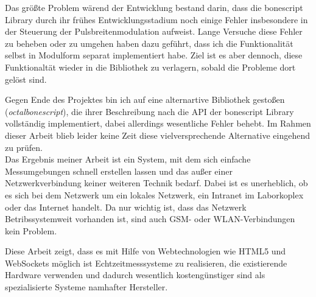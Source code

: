 Das größte Problem wärend der Entwicklung bestand darin, dass die bonescript Library durch ihr frühes Entwicklungsstadium noch einige Fehler insbesondere in der Steuerung der Pulsbreitenmodulation aufweist. Lange Versuche diese Fehler zu beheben oder zu umgehen haben dazu geführt, dass ich die Funktionalität selbst in Modulform separat implementiert habe. Ziel ist es aber dennoch, diese Funktionaltät wieder in die Bibliothek zu verlagern, sobald die Probleme dort gelöst sind. 

Gegen Ende des Projektes bin ich auf eine alternartive Bibliothek gestoßen (\textit{octalbonescript}), die ihrer Beschreibung nach die API der bonescript Library vollständig implementiert, dabei allerdings wesentliche Fehler behebt. Im Rahmen dieser Arbeit blieb leider keine Zeit diese vielversprechende Alternative eingehend zu prüfen.\\

Das Ergebnis meiner Arbeit ist ein System, mit dem sich einfache Messumgebungen schnell erstellen lassen und das außer einer Netzwerkverbindung keiner weiteren Technik bedarf. Dabei ist es unerheblich, ob es sich bei dem Netzwerk um ein lokales Netzwerk, ein Intranet im Laborkoplex oder das Internet handelt. Da nur wichtig ist, dass das Netzwerk Betribssystemweit vorhanden ist, sind auch GSM- oder WLAN-Verbindungen kein Problem.

Diese Arbeit zeigt, dass es mit Hilfe von Webtechnologien wie HTML5 und WebSockets möglich ist Echtzeitmesssysteme zu realisieren, die existierende Hardware verwenden und dadurch wesentlich kostengünstiger sind als spezialisierte Systeme namhafter Hersteller.